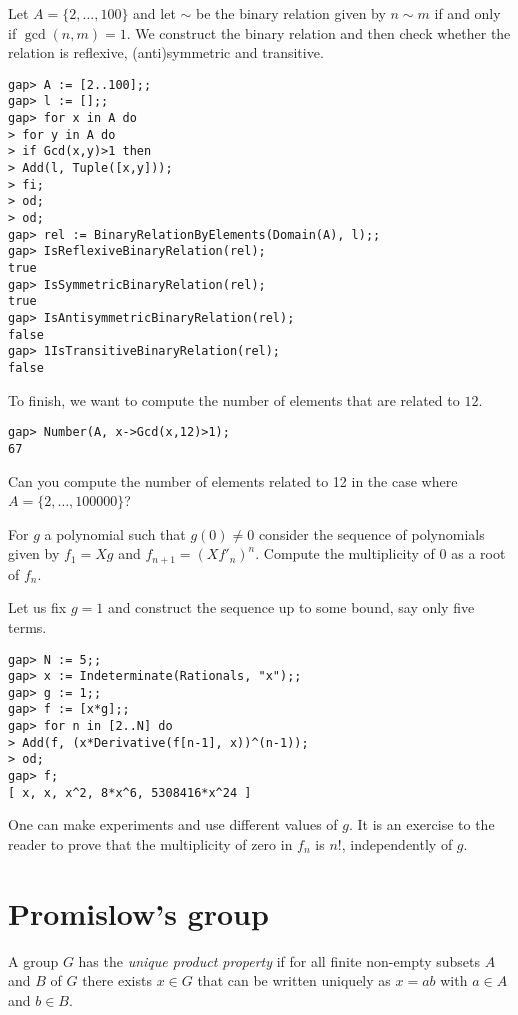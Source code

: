 
%

\begin{example}
Let $A=\{2,\dots,100\}$ and let $\sim$ be the binary
relation given by $n\sim m$ if and only if $\gcd(n,m)=1$.
We construct the binary relation
and then check whether the relation is
reflexive, (anti)symmetric and transitive.

\begin{lstlisting}
gap> A := [2..100];;
gap> l := [];;
gap> for x in A do
> for y in A do
> if Gcd(x,y)>1 then
> Add(l, Tuple([x,y]));
> fi;
> od;
> od;
gap> rel := BinaryRelationByElements(Domain(A), l);;
gap> IsReflexiveBinaryRelation(rel);
true
gap> IsSymmetricBinaryRelation(rel);
true
gap> IsAntisymmetricBinaryRelation(rel);
false
gap> 1IsTransitiveBinaryRelation(rel);
false
\end{lstlisting}

To finish, we want to compute the number
of elements that are related to $12$.

\begin{lstlisting}
gap> Number(A, x->Gcd(x,12)>1);
67
\end{lstlisting}

Can you compute the number of elements
related to 12 in the case
where $A=\{2,\dots,100000\}$?
\end{example}

\begin{example}
For $g$ a polynomial such that $g(0)\ne 0$
consider the sequence of polynomials
given by $f_1=Xg$ and
$f_{n+1}=(Xf'_n)^n$. Compute the multiplicity
of $0$ as a root of $f_n$.

Let us fix $g=1$ and construct the sequence up to
some bound, say only five terms.
\begin{lstlisting}
gap> N := 5;;
gap> x := Indeterminate(Rationals, "x");;
gap> g := 1;;
gap> f := [x*g];;
gap> for n in [2..N] do
> Add(f, (x*Derivative(f[n-1], x))^(n-1));
> od;
gap> f;
[ x, x, x^2, 8*x^6, 5308416*x^24 ]
\end{lstlisting}

One can make experiments and use different values of $g$. It is an exercise to
the reader to prove that the multiplicity of zero in $f_n$ is $n!$,
independently of $g$.
\end{example}

\section{Promislow's group}


\begin{definition}
A group $G$ has the \emph{unique product property} if 
for all finite non-empty subsets $A$ and $B$ of $G$ 
there exists $x\in G$ that can be written uniquely as
$x = ab$ with $a\in A$ and $b\in B$.
\end{definition}

